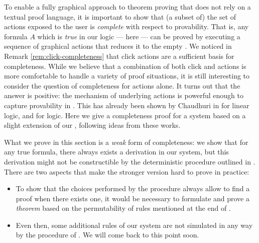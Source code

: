 \begin{scope}
To enable a fully graphical approach to theorem proving that does not rely on a
textual proof language, it is important to show that (a subset of) the set of
actions exposed to the user is \emph{complete} with respect to provability. That
is, any formula $A$ which is \emph{true} in our logic --- here 
 --- can be proved by executing a sequence of graphical actions that reduces
it to the empty . We noticed in Remark \ref{rem:click-completeness} that
click actions are a sufficient basis for completeness. While we believe that a
combination of both click and  actions is more comfortable to handle a
variety of proof situations, it is still interesting to consider the question of
completeness for  actions alone. It turns out that the answer is positive:
the mechanism of \emph{} underlying  actions is powerful
enough to capture provability in . This has already been shown by Chaudhuri
in \cite{Chaudhuri2013} for linear logic, and \cite{DBLP:conf/cade/Chaudhuri21}
for  logic. Here we give a completeness proof for a system based
on a slight extension of our , following ideas from these works.

\begin{remark}
  What we prove in this section is a \emph{weak} form of completeness: we show
  that for any true formula, there always exists a derivation in our  system, but this derivation might not be constructible by the
  deterministic procedure outlined in . There are two aspects
  that make the stronger version hard to prove in practice:
  \begin{itemize}
    \item To show that the choices performed by the  procedure always
    allow to find a proof when there exists one, it would be necessary to
    formulate and prove a \emph{ theorem} based on the permutability of
    rules mentioned at the end of .
    \item Even then, some additional rules of our  system are
    not simulated in any way by the  procedure of . We will come
    back to this point soon.
  \end{itemize}  
\end{remark}


\end{scope}
